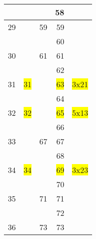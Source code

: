 \begin{tabular}{|r|r|r|r|r|}
\hline                              &                        &         &     58    &                                \\
\hline               29             &                        &     59  &     59    &                                \\
\hline                              &                        &         &     60    &                                \\
\hline               30             &                        &     61  &     61    &                                \\
\hline                              &                        &         &     62    &                                \\
\hline               31             &   \colorbox{yellow}{31}&         &     \colorbox{yellow}{63}    &     \colorbox{yellow}{3x21  }  \\
\hline                              &                        &         &     64    &                                \\
\hline               32             &   \colorbox{yellow}{32}&         &     \colorbox{yellow}{65}    &     \colorbox{yellow}{5x13  }  \\
\hline                              &                        &         &     66    &                                \\
\hline               33             &                        &     67  &     67    &                                \\
\hline                              &                        &         &     68    &                                \\
\hline               34             &   \colorbox{yellow}{34}&         &     \colorbox{yellow}{69}    &     \colorbox{yellow}{3x23  }  \\
\hline                              &                        &         &     70    &                                \\
\hline               35             &                        &     71  &     71    &                                \\
\hline                              &                        &         &     72    &                                \\
\hline               36             &                        &     73  &     73    &                                \\

\end{tabular}
